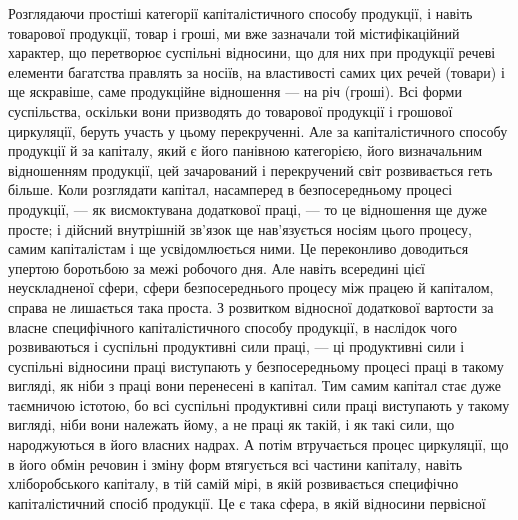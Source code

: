 Розглядаючи простіші категорії капіталістичного способу продукції, і навіть
товарової продукції, товар і гроші, ми вже зазначали той містифікаційний
характер, що перетворює суспільні відносини, що для них при продукції речеві
елементи багатства правлять за носіїв, на властивості самих цих речей (товари)
і ще яскравіше, саме продукційне відношення — на річ (гроші). Всі форми
суспільства, оскільки вони призводять до товарової продукції і грошової циркуляції,
беруть участь у цьому перекрученні. Але за капіталістичного способу
продукції й за капіталу, який є його панівною категорією, його визначальним
відношенням продукції, цей зачарований і перекручений світ розвивається геть
більше. Коли розглядати капітал, насамперед в безпосередньому процесі продукції,
— як висмоктувана додаткової праці, — то це відношення ще дуже просте;
і дійсний внутрішній зв’язок ще нав’язується носіям цього процесу, самим
капіталістам і ще усвідомлюється ними. Це переконливо доводиться упертою
боротьбою за межі робочого дня. Але навіть всередині цієї неускладненої сфери,
сфери безпосереднього процесу між працею й капіталом, справа не лишається
така проста. З розвитком відносної додаткової вартости за власне специфічного
капіталістичного способу продукції, в наслідок чого розвиваються і суспільні
продуктивні сили праці, — ці продуктивні сили і суспільні відносини праці виступають
у безпосередньому процесі праці в такому вигляді, як ніби з праці
вони перенесені в капітал. Тим самим капітал стає дуже таємничою істотою,
бо всі суспільні продуктивні сили праці виступають у такому вигляді,
ніби вони належать йому, а не праці як такій, і як такі сили, що народжуються
в його власних надрах. А потім втручається процес циркуляції, що
в його обмін речовин і зміну форм втягується всі частини капіталу, навіть
хліборобського капіталу, в тій самій мірі, в якій розвивається специфічно
капіталістичний спосіб продукції. Це є така сфера, в якій відносини первісної